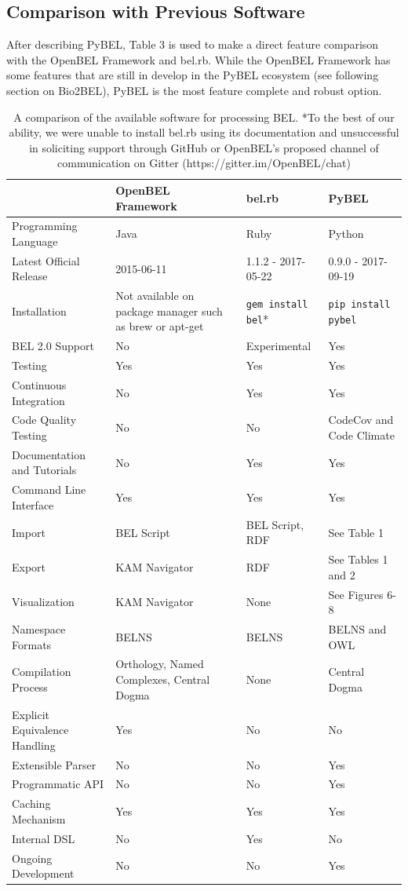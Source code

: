 \subsection{Comparison with Previous Software}

After describing PyBEL, Table 3 is used to make a direct feature comparison with the OpenBEL Framework and bel.rb. While the OpenBEL Framework has some features that are still in develop in the PyBEL ecosystem (see following section on Bio2BEL), PyBEL is the most feature complete and robust option.

\begin{table}
\centering
\caption[BEL Software Ecosystem Comparison]{A comparison of the available software for processing \ac{BEL}. *To the best of our ability, we were unable to install bel.rb using its documentation and unsuccessful in soliciting support through GitHub or OpenBEL's proposed channel of communication on Gitter (https://gitter.im/OpenBEL/chat)}
\label{tab:comparison}
\def\arraystretch{1.1}
\begin{tabular}{p{4cm} p{4cm} p{4cm} p{4cm}}
 & OpenBEL Framework & bel.rb & PyBEL \\
\hline
Programming Language & Java & Ruby & Python \\
Latest Official Release & 2015-06-11 & 1.1.2 - 2017-05-22 & 0.9.0 - 2017-09-19 \\
Installation & Not available on package manager such as brew or apt-get & \verb|gem install bel|* & \verb|pip install pybel| \\
BEL 2.0 Support & No & Experimental & Yes \\
Testing & Yes & Yes & Yes \\
Continuous Integration & No & Yes & Yes \\
Code Quality Testing & No & No & CodeCov and Code Climate \\
Documentation and Tutorials & No & Yes & Yes \\
Command Line Interface & Yes & Yes & Yes \\
Import & BEL Script & BEL Script, RDF & See Table 1 \\
Export & KAM Navigator & RDF & See Tables 1 and 2 \\
Visualization & KAM Navigator & None & See Figures 6-8 \\
Namespace Formats & BELNS & BELNS & BELNS and OWL \\
Compilation Process & Orthology, Named Complexes, Central Dogma & None & Central Dogma \\
Explicit Equivalence Handling & Yes & No & No \\
Extensible Parser & No & No & Yes \\
Programmatic API & No & No & Yes \\
Caching Mechanism & Yes & Yes & Yes \\
Internal DSL & No & Yes & No \\
Ongoing Development & No & No & Yes
\end{tabular}
\end{table}

